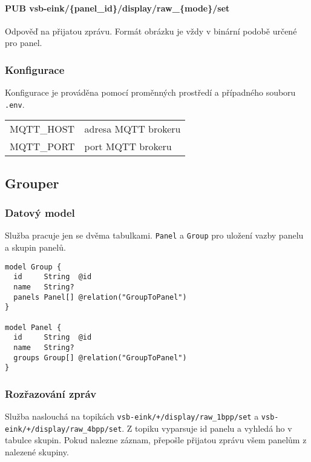 \paragraph*{PUB vsb-eink/\{panel\_id\}/display/raw\_\{mode\}/set}
Odpověď na přijatou zprávu. Formát obrázku je vždy v binární podobě určené pro panel.

\subsubsection{Konfigurace}
Konfigurace je prováděna pomocí proměnných prostředí a případného souboru \lstinline{.env}.
\begin{table}[h]
    \begin{tabular}{ll}
        MQTT\_HOST & adresa MQTT brokeru \\
        MQTT\_PORT & port MQTT brokeru \\
    \end{tabular}
\end{table}

\subsection{Grouper}
\subsubsection{Datový model}
Služba pracuje jen se dvěma tabulkami. \lstinline|Panel| a \lstinline|Group| pro uložení vazby panelu a skupin panelů.

\begin{lstlisting}[label=src:grouper-schema,caption={Schém}]
model Group {
  id     String  @id
  name   String?
  panels Panel[] @relation("GroupToPanel")
}

model Panel {
  id     String  @id
  name   String?
  groups Group[] @relation("GroupToPanel")
}
\end{lstlisting}

\subsubsection{Rozřazování zpráv}
Služba naslouchá na topikách \lstinline|vsb-eink/+/display/raw_1bpp/set| a \lstinline|vsb-eink/+/display/raw_4bpp/set|. Z topiku vyparsuje id panelu a vyhledá ho v tabulce skupin. Pokud nalezne záznam, přepošle přijatou zprávu všem panelům z nalezené skupiny.

